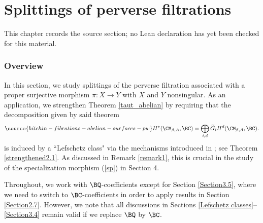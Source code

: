 \chapter{Splittings of perverse filtrations}
\label{hitchin-fibrations-abelian-surfaces-pw-chapter-04}

\begin{remark}
\label{hitchin-fibrations-abelian-surfaces-pw-chapter-04-source}
This chapter records the source section; no Lean declaration has yet been checked for this material.
\notready
\end{remark}

\subsection{Overview}
In this section, we study splittings of the perverse filtration associated with a proper surjective morphism $\pi: X\to Y$ with $X$ and $Y$ nonsingular. As an application, we strengthen Theorem \ref{taut_abelian} by requiring that the decomposition  {given by said theorem}
\begin{equation}\label{decomp6}
\source{hitchin-fibrations-abelian-surfaces-pw}
H^\ast(\CM_{\beta, A}, \BC) = \bigoplus_{i,d} \widetilde{G}_iH^d(\CM_{\beta, A}, \BC).
\end{equation}
is induced by a ``Lefschetz class" via the mechanisms introduced in \cite{D,dC,dCM4}; see Theorem \ref{strengthened2.1}. As discussed in Remark \ref{remark1}, this is crucial in the study of the specialization morphism (\ref{sp}) in Section 4.

Throughout, we work with $\BQ$-coefficients except for Section \ref{Section3.5}, where we need to switch to $\BC$-coefficients in order to apply results in Section \ref{Section2.7}. However, we note that all discussions in
Sections \ref{Lefschetz classes}--\ref{Section3.4} remain valid if we replace $\BQ$ by $\BC$.

